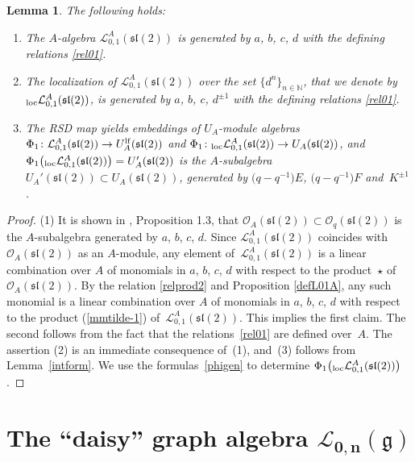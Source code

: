\documentclass[pdftex]{sigma}%
\numberwithin{equation}{section}
\numberwithin{figure}{section}
\newtheorem{lem}[teo]{Lemma}
\newcommand{\mn}{\mathbb{N}}
\newcommand{\Ll}{{\mathcal L}}
\newcommand{\Oo}{{\mathcal O}}
\newcommand{\ra}{\rightarrow}
\begin{document}
\begin{lem} \label{intsl2} The following holds:
\begin{enumerate}\itemsep=0pt
\item[$1.$] The $A$-algebra $\Ll^A_{0,1}({\mathfrak{sl}}(2))$ is generated by $a$, $b$, $c$, $d$ with the defining relations \eqref{rel01}.

\item[$2.$] The localization of $\Ll^A_{0,1}({\mathfrak{sl}}(2))$ over the set $\{d^n\}_{n\in \mn}$, that we denote by ${}_{\rm loc}\Ll^A_{0,1}({\mathfrak{sl}}(2))$, is generated by $a$, $b$, $c$, $d^{\pm 1}$ with the defining relations \eqref{rel01}.

\item[$3.$] The RSD map yields embeddings of $U_A$-module algebras $\Phi_1 \colon \Ll^A_{0,1}({\mathfrak{sl}}(2)) \ra U_A^{\rm lf}({\mathfrak{sl}}(2))$ and $\Phi_1 \colon {}_{\rm loc}\Ll^A_{0,1}({\mathfrak{sl}}(2)) \ra U_A({\mathfrak{sl}}(2))$, and $\Phi_1\big({}_{\rm loc}\Ll^A_{0,1}({\mathfrak{sl}}(2))\big) = U_A'({\mathfrak{sl}}(2))$ is the $A$-subalgebra $U_A'({\mathfrak{sl}}(2))\subset U_A({\mathfrak{sl}}(2))$, generated by $\big(q-q^{-1}\big)E$, $\big(q-q^{-1}\big)F$ and~$K^{\pm 1}$.
\end{enumerate}
\end{lem}
\begin{proof} (1) It is shown in \cite{DC-L}, Proposition 1.3, that $\Oo_A({\mathfrak{sl}}(2))\subset \Oo_q({\mathfrak{sl}}(2))$ is the $A$-subalgebra generated by $a$, $b$, $c$, $d$. Since $\Ll^A_{0,1}({\mathfrak{sl}}(2))$ coincides with $\Oo_A({\mathfrak{sl}}(2))$ as an $A$-module, any element of~$\Ll^A_{0,1}({\mathfrak{sl}}(2))$ is a linear combination over $A$ of monomials in $a$, $b$, $c$, $d$ with respect to the product~$\star$ of~$\Oo_A({\mathfrak{sl}}(2))$. By the relation \eqref{relprod2} and Proposition \ref{defL01A}, any such monomial is a linear combination over $A$ of monomials in $a$, $b$, $c$, $d$ with respect to the product (\ref{mmtilde-1}) of~$\Ll^A_{0,1}({\mathfrak{sl}}(2))$. This implies the first claim. The second follows from the fact that the relations~\eqref{rel01} are defined over~$A$. The assertion (2) is an immediate consequence of~(1), and~(3) follows from Lemma~\ref{intform}. We use the formulas~\eqref{phigen} to determine $\Phi_1\big({}_{\rm loc}\Ll^A_{0,1}({\mathfrak{sl}}(2))\big)$.\end{proof}

\section[The ''daisy'' graph algebra L\_\{0,n\}(g)]{The ``daisy'' graph algebra $\boldsymbol{\Ll_{0,n}(\mathfrak g)}$}\label{Lgnalg}
\end{document}
